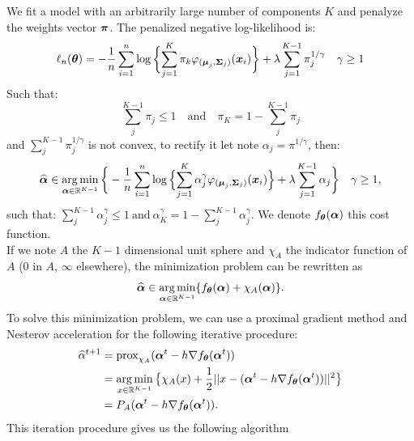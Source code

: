  We fit a model with an arbitrarily large number of components $K$ and penalyze the weights vector $\boldsymbol \pi$. The penalized negative log-likelihood is:
\begin{equation}
  \ell_n({\boldsymbol\theta})=
-\frac{1}{n}\sum_{i=1}^{n}\log\bigg\{{\sum_{j=1}^K\pi_k\varphi_{(\boldsymbol\mu_{j},\boldsymbol\Sigma_{j})}(\boldsymbol x_i)}\bigg\}+\lambda\sum_{j=1}^{K-1}\pi_j^{1/\gamma}\quad \gamma\geq1
\end{equation}
Such that:
\begin{equation}
  \sum_{j}^{K-1}\pi_j \leq 1 \quad \text{and} \quad \pi_{K}=1-\sum_{j}^{K-1}\pi_j
\end{equation}
and $\sum_{j}^{K-1}\pi_j^{1/\gamma}$ is not convex, to rectify it let note $\alpha_j = \pi^{1/\gamma}$, then:
\begin{equation}
\widehat{\boldsymbol \alpha}\in\operatorname*{arg\,min}_{\boldsymbol \alpha\in {\mathbb R}^{K-1}}\bigg\{
-\frac{1}{n}\sum_{i=1}^{n}\log\Big\{{\sum_{j=1}^K\alpha^\gamma_j\varphi_{(\boldsymbol\mu_{j},\boldsymbol\Sigma_{j})}(\boldsymbol x_i)}\Big\}+\lambda\sum_{j=1}^{K-1}\alpha_j \color{black} \bigg\}\quad \gamma\geq1,  
\end{equation}
such that: $\sum_{j}^{K-1}\alpha_j^\gamma \leq 1\ \text{and}\ \alpha^\gamma_{K}=1-\sum_{j}^{K-1}\alpha_j^\gamma$. We denote $f_{\boldsymbol\theta}(\boldsymbol \alpha)$ \color{black} this cost function.\\
If we note $A$ the $K-1$ dimensional unit sphere and {\large$\chi_A$} the indicator function of $A$ ($0$ in $A$, $\infty$ elsewhere), the minimization problem can be rewritten as
\begin{equation}
  \widehat{\boldsymbol \alpha}\in\operatorname*{arg\,min}_{\boldsymbol \alpha\in{\mathbb R}^{K-1}}\{ f_{\boldsymbol\theta}(\boldsymbol \alpha) + \chi_A(\boldsymbol \alpha)  \}.
\end{equation}
To solve this minimization problem, we can use a proximal gradient method and Nesterov acceleration for the following iterative procedure:
\begin{align}
\widehat\alpha^{t+1}
&={\text{prox}}_{\chi_A}( \boldsymbol \alpha^t - h \nabla f_{{\boldsymbol\theta}}(\boldsymbol \alpha^t)  )\\
&=\operatorname*{arg\,min}_{x\in{\mathbb R}^{K-1}}\big\{ \chi_A(x) + \frac{1}{2}||x-(\boldsymbol \alpha^t - h \nabla f_{{\boldsymbol\theta}}(\boldsymbol \alpha^t)) ||^2 \big\}\\
&=P_A( \boldsymbol \alpha^t - h \nabla f_{{\boldsymbol\theta}}(\boldsymbol \alpha^t) ).
\end{align}
This iteration procedure gives us the following algorithm
